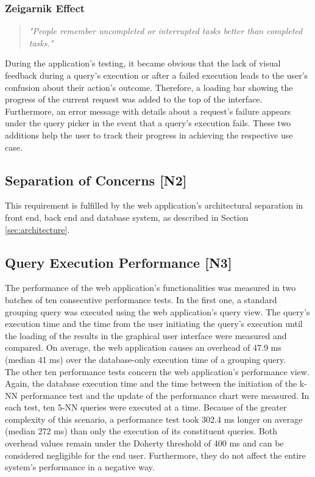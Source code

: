 \subsubsection{Zeigarnik Effect}
\begin{quote}
	\textit{"People remember uncompleted or interrupted tasks better than completed tasks."}
\end{quote}
During the application's testing, it became obvious that the lack of visual feedback during a query's execution or after a failed execution leads to the user's confusion about their action's outcome. Therefore, a loading bar showing the progress of the current request was added to the top of the interface. Furthermore, an error message with details about a request's failure appears under the query picker in the event that a query's execution fails. These two additions help the user to track their progress in achieving the respective use case.

\subsection{Separation of Concerns [N2]}
This requirement is fulfilled by the web application's architectural separation in front end, back end and database system, as described in Section \ref{sec:architecture}.

\subsection{Query Execution Performance [N3]}
The performance of the web application's functionalities was measured in two batches of ten consecutive performance tests. In the first one, a standard grouping query was executed using the web application's query view. The query's execution time and the time from the user initiating the query's execution until the loading of the results in the graphical user interface were measured and compared. On average, the web application causes an overhead of 47.9 ms (median 41 ms) over the database-only execution time of a grouping query. \\
The other ten performance tests concern the web application's performance view. Again, the database execution time and the time between the initiation of the k-NN performance test and the update of the performance chart were measured. In each test, ten 5-NN queries were executed at a time. Because of the greater complexity of this scenario, a performance test took 302.4 ms longer on average (median 272 ms) than only the execution of its constituent queries. Both overhead values remain under the Doherty threshold of 400 ms and can be considered negligible for the end user. Furthermore, they do not affect the entire system's performance in a negative way.

